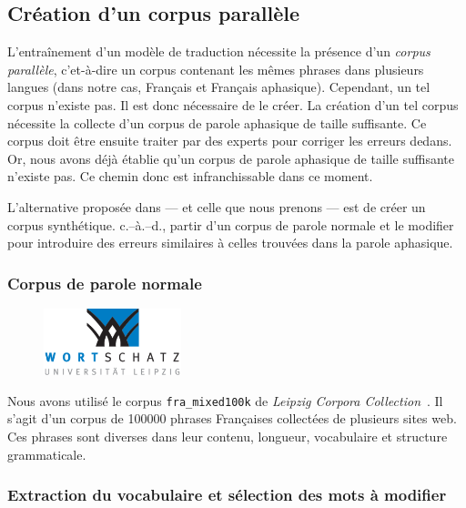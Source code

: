 \subsection{Création d'un corpus parallèle}

L'entraînement d'un modèle de traduction nécessite la présence d'un \emph{corpus parallèle}, 
c'et-à-dire un corpus contenant les mêmes phrases dans plusieurs langues 
(dans notre cas, Français et Français aphasique).
Cependant, un tel corpus n'existe pas. 
Il est donc nécessaire de le créer.
La création d'un tel corpus nécessite la collecte d'un corpus de parole aphasique de taille suffisante.
Ce corpus doit être ensuite traiter par des experts pour corriger les erreurs dedans.
Or, nous avons déjà établie qu'un corpus de parole aphasique de taille suffisante n'existe pas.
Ce chemin donc est infranchissable dans ce moment.

L'alternative proposée dans \cite{Smaili_Langlois_Pribil_2022} --- et celle que nous prenons --- 
est de créer un corpus synthétique.
c.--à.--d., partir d'un corpus de parole normale et le modifier pour introduire 
des erreurs similaires à celles trouvées dans la parole aphasique.

\subsubsection{Corpus de parole normale}

\begin{figure}
    \centering
    \includegraphics[width=4cm]{assets/images/ws.png}
\end{figure}

Nous avons utilisé le corpus \texttt{fra\_mixed100k} de 
\emph{\foreignlanguage{english}{Leipzig Corpora Collection}}~\cite{Goldhahn_Eckart_Quasthoff}.
Il s'agit d'un corpus de 100000 phrases Françaises collectées de plusieurs sites web.
Ces phrases sont diverses dans leur contenu, longueur, vocabulaire et structure grammaticale.

\subsubsection{Extraction du vocabulaire et sélection des mots à modifier}

